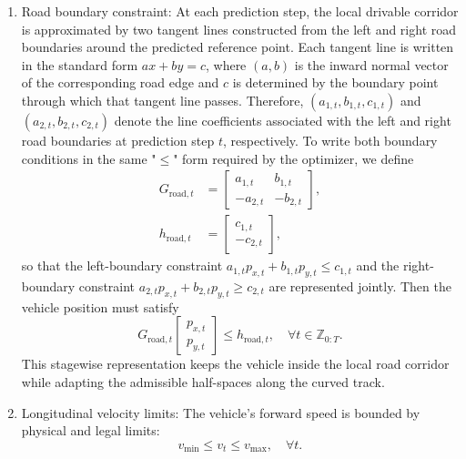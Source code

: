 \documentclass[pdflatex,sn-mathphys,Numbered]{sn-jnl}
\numberwithin{equation}{section}
\begin{document}
\begin{enumerate}
		\item[ii)] {Road boundary constraint:}  
		At each prediction step, the local drivable corridor is approximated by two tangent lines constructed from the left and right road boundaries around the predicted reference point. Each tangent line is written in the standard form $ax+by=c$, where $(a,b)$ is the inward normal vector of the corresponding road edge and $c$ is determined by the boundary point through which that tangent line passes. Therefore, $(a_{1,t}, b_{1,t}, c_{1,t})$ and $(a_{2,t}, b_{2,t}, c_{2,t})$ denote the line coefficients associated with the left and right road boundaries at prediction step $t$, respectively. To write both boundary conditions in the same "$\le$" form required by the optimizer, we define
		\begin{equation}
			\begin{aligned}
				G_{\text{road},t} &=
				\begin{bmatrix}
					a_{1,t} & b_{1,t} \\
					-a_{2,t} & -b_{2,t}
				\end{bmatrix},
				\\
				h_{\text{road},t} &=
				\begin{bmatrix}
					c_{1,t} \\
					-c_{2,t}
				\end{bmatrix},
			\end{aligned}
			\label{equ:sec2_road_halfspace_matrices}
		\end{equation}
			so that the left-boundary constraint $a_{1,t} p_{x,t} + b_{1,t} p_{y,t} \le c_{1,t}$ and the right-boundary constraint $a_{2,t} p_{x,t} + b_{2,t} p_{y,t} \ge c_{2,t}$ are represented jointly. Then the vehicle position must satisfy
		\begin{equation}
			G_{\text{road},t}
			\begin{bmatrix}
				p_{x,t} \\
				p_{y,t}
			\end{bmatrix}
			\le h_{\text{road},t},
			\quad \forall t \in \mathbb{Z}_{0:T}.
			\label{equ:sec2_road_halfspace_constraint}
		\end{equation}
		This stagewise representation keeps the vehicle inside the local road corridor while adapting the admissible half-spaces along the curved track.
		
		\item[iii)] {Longitudinal velocity limits:}  
		The vehicle's forward speed is bounded by physical and legal limits:
		\begin{equation}
			v_{\min} \le v_t \le v_{\max}, \quad \forall t.
			\label{equ:sec2_velocity_limits}
		\end{equation}
		

\end{enumerate}
\end{document}
